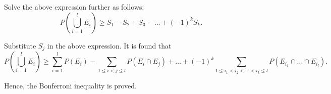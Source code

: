 \documentclass{article}
\begin{document}
\begin{enumerate}
Solve the above expression further as follows:
\begin{equation*}
P\left(\bigcup_{i=1}^{l} E_i\right) \geq S_1 - S_2 + S_3 - \ldots + (-1)^{k} S_k.
\end{equation*}

Substitute \( S_j \) in the above expression. It is found that
\begin{equation*}
P\left(\bigcup_{i=1}^{l} E_i\right) \geq \sum_{i=1}^{l} P(E_i) - \sum_{1 \leq i < j \leq l} P(E_i \cap E_j) + \ldots + (-1)^{k} \sum_{1 \leq i_1 < i_2 < \dots < i_k \leq l} P\left(E_{i_1}\cap...\cap E_{i_l}\right).
\end{equation*}

Hence, the Bonferroni inequality is proved.
\end{enumerate}
\end{document}
